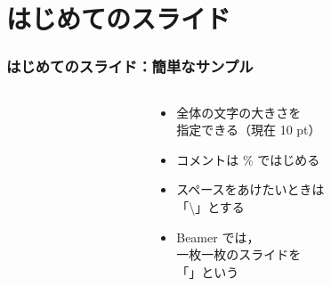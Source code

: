 \section{はじめてのスライド}

\begin{frame}[fragile]
  \frametitle{はじめてのスライド：簡単なサンプル}
  \begin{columns}
    \begin{column}{0.55\textwidth}
      
    \end{column}
    \begin{column}{0.45\textwidth}
      \begin{itemize}
        \item
        全体の文字の大きさを\\
        指定できる{\footnotesize （現在 10 pt）}
        \item
        コメントは \alert{\% ではじめる}
        \item
        スペースをあけたいときは\\
        「\textbackslash\textvisiblespace」とする
        \item
        Beamer では，\\
        一枚一枚のスライドを\\
        「」という
      \end{itemize}
    \end{column}
  \end{columns}

\end{frame}

